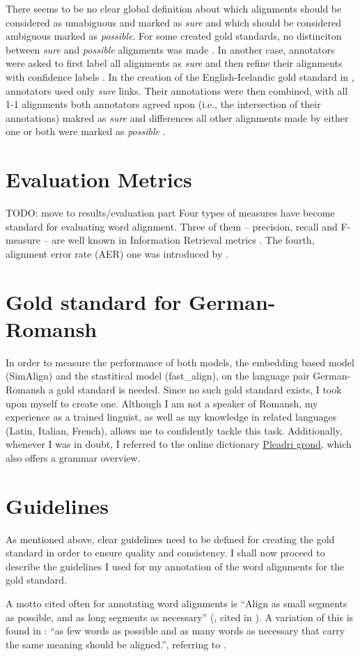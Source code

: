 There seems to be no clear global definition about which alignments should be considered as umabiguous and marked as \emph{sure} and which should be considered ambiguous marked as \emph{possible}. 
For some created gold standards, no distinciton between \emph{sure} and \emph{possible} alignments was made \autocite{clematide2018}. 
In another case, annotators were asked to first label all alignments as \emph{sure} and then refine their alignments with confidence labels \autocite{holmqvist-ahrenberg-2011-gold}. 
In the creation of the English-Icelandic gold standard in \cite{steingrimsson-etal-2021-combalign},  annotators used only \emph{sure} links. 
Their annotations were then combined, with all 1-1 alignments both annotators agreed upon (i.e., the intersection of their annotations) makred as \emph{sure} and differences all other alignments made by either one or both were marked as \emph{possible} \autocite{steingrimsson-etal-2021-combalign}. 

\section{Evaluation Metrics}
TODO: move to results/evaluation part
Four types of measures have become standard for evaluating word alignment. Three of them -- precision, recall and F-measure -- are well known in Information Retrieval metrics \cite{mihalcea-pedersen-2003-evaluation}. 
The fourth, alignment error rate (AER) one was introduced by \cite{och-ney-2000-improved}.

\section{Gold standard for German-Romansh}
In order to measure the performance of both models, the embedding based model (SimAlign) and the stastitical model (fast\_align), on the language pair German-Romansh a gold standard is needed. 
Since no such gold standard exists, I took upon myself to create one. 
Although I am not a speaker of Romansh, my experience as a trained linguist, as well as my knowledge in related languages (Latin, Italian, French), allows me to confidently tackle this task. 
Additionally, whenever I was in doubt, I referred to the online dictionary \href{https://www.pledarigrond.ch/rumantschgrischun}{Pleadri grond}, which also offers a grammar overview.


\section{Guidelines}
As mentioned above, clear guidelines need to be defined for creating the gold standard in order to ensure quality and consistency. I shall now proceed to describe the guidelines I used for my annotation of the word alignments for the gold standard.

A motto cited often for annotating word alignments is \enquote{Align as small segments as possible, and as long segments as necessary} (\cite{Vronis00evaluationof}, cited in \cite{lines2007}). A variation of this is found in \cite{clematide2018}: \enquote{as few words as possible and as many words as necessary that carry the same meaning should be aligned.}, referring to \cite{lambert2005}. 